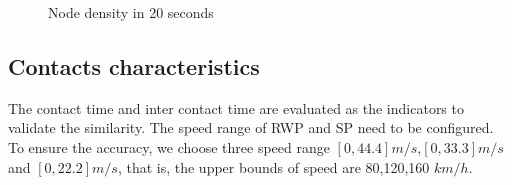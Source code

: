 \begin{figure}
\centering
{}

\caption{Node density in 20 seconds}\label{figure_node_distribution}
\end{figure}


\subsection{Contacts characteristics}

The contact time and inter contact time are evaluated as the indicators to validate the similarity. The speed range of RWP and SP need to be configured. To ensure the accuracy, we choose three speed range $[0,44.4]m/s$,$[0,33.3]m/s$ and $[0,22.2]m/s$, that is, the upper bounds of speed are 80,120,160 $km/h$.


